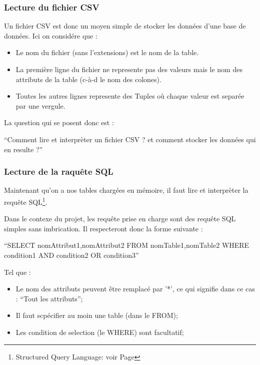 \documentclass[oneside,13pt,a4paper]{report}
\begin{document}
\subsubsection{Lecture du fichier CSV}

Un fichier CSV est donc un moyen simple de stocker les données d'une base de données.
Ici on considére que :
\begin{itemize}
	\item Le nom du fichier (sans l'extensions) est le nom de la table.
	\item La première ligne du fichier ne represente pas des valeurs mais le nom des attributs de la table (c-à-d le nom des colones).
	\item Toutes les autres lignes represente des Tuples où chaque valeur est separée par une vergule.
\end{itemize}
\vspace{0.3cm}

La question qui se posent donc est :
\begin{center}
	\enquote{Comment lire et interprèter un fichier CSV ? et comment stocker les données qui en resulte ?}
\end{center}

\subsubsection{Lecture de la raquête SQL}

Maintenant qu'on a nos tables chargées en mémoire, il faut lire et interprèter la requête SQL\footnote{Structured Query Language: voir Page \pageref{sql}}.

Dans le contexe du projet, les requête prise en charge sont des requête SQL simples sans imbrication. Il respecteront donc la forme suivante :

\enquote{SELECT nomAttribut1,nomAttribut2 FROM nomTable1,nomTable2 WHERE condition1 AND condition2 OR condition3}

Tel que :
\begin{itemize}
	\item Le nom des attributs peuvent être remplacé par '*', ce qui signifie dans ce cas : \enquote{Tout les attributs};
	\item Il faut scpécifier au moin une table (dans le FROM);
	\item Les condition de selection (le WHERE) sont facultatif;
\end{itemize}
\vspace{0.3cm}
\end{document}
